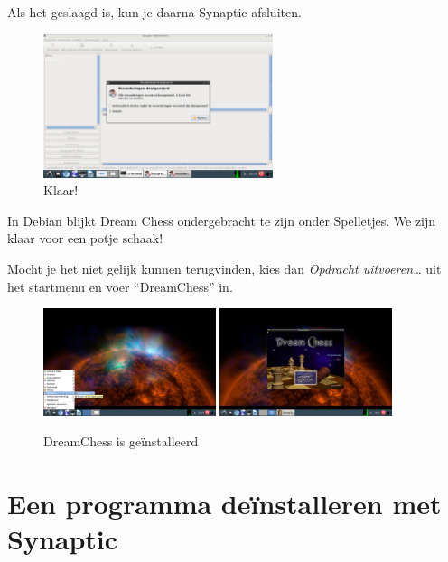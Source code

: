 \documentclass[12pt,a4paper]{article}
\begin{document}
\clearpage

\noindent Als het geslaagd is, kun je daarna Synaptic afsluiten.

\begin{figure} [H]
\centering
\includegraphics[width=0.6\textwidth]{plaatje13}
\caption{Klaar!}
\label{plaatje13}
\end{figure}

\noindent In Debian blijkt Dream Chess ondergebracht te zijn onder Spelletjes. We zijn klaar voor een potje schaak!

Mocht je het niet gelijk kunnen terugvinden, kies dan \emph{Opdracht uitvoeren\ldots} uit het startmenu en voer ``DreamChess'' in.

\begin{figure} [H]
\centering
\includegraphics[width=0.45\textwidth]{plaatje14}
\includegraphics[width=0.45\textwidth]{plaatje15}
\caption{DreamChess is ge\"{i}nstalleerd}
\label{plaatje14}
\end{figure}

\clearpage

\section{Een programma de\"{i}nstalleren met Synaptic}
\end{document}
